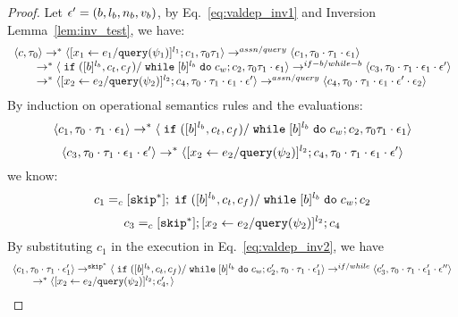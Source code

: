 {\begin{proof}
Let $\mathtt{\epsilon}' = (b, l_b, n_b, v_b)$, by Eq.~\ref{eq:valdep_inv1} and {Inversion Lemma~\ref{lem:inv_test}}, we have:
\begin{equation}
\label{eq:m1test_inv1}
  \begin{array}{l}   
\langle {c}, \mathtt{\tau}_0 \rangle \rightarrow^{*} 
\langle [\mathrel{ {x}_1 \leftarrow e_1 / {\tt query}(\psi_1) }]^{l_1} ; {c}_1, \mathtt{\tau}_0 \mathtt{\tau}_1 \rangle  
\rightarrow^{assn/query}
 \langle c_1, \mathtt{\tau}_0 \cdot \mathtt{\tau}_1 \cdot \mathtt{\epsilon}_1 \rangle 
 \\
  \qquad \rightarrow^{*} 
  \langle \;\mathtt{if}\; ([b]^{l_b}, c_t, c_f) / \;\mathtt{while}\; [b]^{l_b} \;\mathtt{do}\; c_w;{c}_2, 
  \mathtt{\tau}_0 \mathtt{\tau}_1 \cdot \mathtt{\epsilon}_1 \rangle 
 \rightarrow^{if-b / while-b} 
  \langle c_3, 
  \mathtt{\tau}_0 \cdot \mathtt{\tau}_1 \cdot \mathtt{\epsilon}_1 \cdot \mathtt{\epsilon}' \rangle 
  \\
  \qquad   \rightarrow^{*} 
  \langle [\mathrel{ {x}_2 \leftarrow e_2 / {\tt query}(\psi_2) }]^{l_2};{c}_4, 
  \mathtt{\tau}_0 \cdot \mathtt{\tau}_1 \cdot \mathtt{\epsilon}_1 \cdot \mathtt{\epsilon}' \rangle 
  \rightarrow^{assn/query} 
  \langle {c}_4,  \mathtt{\tau}_0 \cdot \mathtt{\tau}_1 \cdot \mathtt{\epsilon}_1 \cdot \mathtt{\epsilon}' \cdot \mathtt{\epsilon}_2 \rangle 
\end{array}
\end{equation}
 By induction on operational semantics rules and the evaluations: 
 \[
  \langle c_1, \mathtt{\tau}_0 \cdot \mathtt{\tau}_1 \cdot \mathtt{\epsilon}_1 \rangle 
  \rightarrow^{*} 
  \langle \;\mathtt{if}\; ([b]^{l_b}, c_t, c_f) / \;\mathtt{while}\; [b]^{l_b} \;\mathtt{do}\; c_w;{c}_2, 
  \mathtt{\tau}_0 \mathtt{\tau}_1 \cdot \mathtt{\epsilon}_1 \rangle 
 \]
 \[
 \langle c_3, 
  \mathtt{\tau}_0 \cdot \mathtt{\tau}_1 \cdot \mathtt{\epsilon}_1 \cdot \mathtt{\epsilon}' \rangle 
  \rightarrow^{*} 
  \langle [\mathrel{ {x}_2 \leftarrow e_2 / {\tt query}(\psi_2) }]^{l_2};{c}_4, 
  \mathtt{\tau}_0 \cdot \mathtt{\tau}_1 \cdot \mathtt{\epsilon}_1 \cdot \mathtt{\epsilon}' \rangle 
 \]
 we know:
 \[
 c_1 =_c 
 [\mathtt{skip}^*]; \;\mathtt{if}\; ([b]^{l_b}, c_t, c_f) / \;\mathtt{while}\; [b]^{l_b} \;\mathtt{do}\; c_w;{c}_2
 \]
  \[
 c_3 =_c 
 [\mathtt{skip}^*]; [\mathrel{ {x}_2 \leftarrow e_2 / {\tt query}(\psi_2) }]^{l_2};{c}_4
 \]
By substituting $c_1$ in the execution in Eq.~\ref{eq:valdep_inv2}, we have 
\begin{equation}
\label{eq:m1test_inv2}
  \begin{array}{l}   
  \langle c_1, \mathtt{\tau}_0 \cdot \mathtt{\tau}_1 \cdot \mathtt{\epsilon}_1' \rangle 
  \rightarrow^{\mathtt{skip}^*} 
  \langle \;\mathtt{if}\; ([b]^{l_b}, c_t, c_f) / \;\mathtt{while}\; [b]^{l_b} \;\mathtt{do}\; c_w ; {c}_2', \mathtt{\tau}_0 \cdot \mathtt{\tau}_1 \cdot \mathtt{\epsilon}_1' \rangle 
  \rightarrow^{if / while} 
  \langle c_3', \mathtt{\tau}_0 \cdot \mathtt{\tau}_1 \cdot \mathtt{\epsilon}_1' \cdot \mathtt{\epsilon}'' \rangle 
  \\
  \qquad \rightarrow^{*} 
  \langle [\mathrel{ {x}_2 \leftarrow e_2 / {\tt query}(\psi_2) }]^{l_2};{c}_4', 
 \rangle
\end{array}
\end{equation}
\end{proof}}
